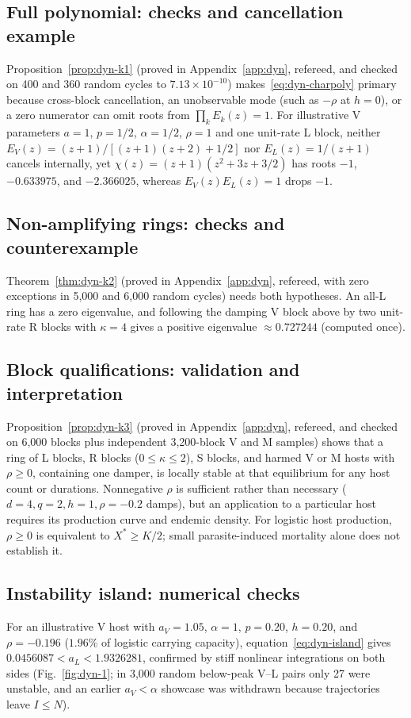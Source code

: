 \subsection{Full polynomial: checks and cancellation example}\label{esm:trim-dyn-k1}
Proposition~\ref{prop:dyn-k1} (proved in Appendix~\ref{app:dyn}, refereed, and checked on 400 and 360 random cycles to $7.13 \times 10^{-10}$) makes~\eqref{eq:dyn-charpoly} primary because cross-block cancellation, an unobservable mode (such as $-\rho$ at $h = 0$), or a zero numerator can omit roots from $\prod_k E_k(z) = 1$. For illustrative V parameters $a = 1$, $p = 1/2$, $\alpha = 1/2$, $\rho = 1$ and one unit-rate L block, neither $E_V(z) = (z + 1)/[(z + 1)(z + 2) + 1/2]$ nor $E_L(z) = 1/(z + 1)$ cancels internally, yet $\chi(z) = (z + 1)(z^2 + 3z + 3/2)$ has roots $-1$, $-0.633975$, and $-2.366025$, whereas $E_V(z)E_L(z) = 1$ drops $-1$.

\subsection{Non-amplifying rings: checks and counterexample}\label{esm:trim-dyn-k2}
Theorem~\ref{thm:dyn-k2} (proved in Appendix~\ref{app:dyn}, refereed, with zero exceptions in 5,000 and 6,000 random cycles) needs both hypotheses. An all-L ring has a zero eigenvalue, and following the damping V block above by two unit-rate R blocks with $\kappa = 4$ gives a positive eigenvalue $\approx 0.727244$ (computed once).

\subsection{Block qualifications: validation and interpretation}\label{esm:trim-dyn-k3}
Proposition~\ref{prop:dyn-k3} (proved in Appendix~\ref{app:dyn}, refereed, and checked on 6,000 blocks plus independent 3,200-block V and M samples) shows that a ring of L blocks, R blocks ($0 \le \kappa \le 2$), S blocks, and harmed V or M hosts with $\rho \ge 0$, containing one damper, is locally stable at that equilibrium for any host count or durations. Nonnegative $\rho$ is sufficient rather than necessary ($d = 4, q = 2, h = 1, \rho = -0.2$ damps), but an application to a particular host requires its production curve and endemic density. For logistic host production, $\rho\geq0$ is equivalent to $X^*\geq K/2$; small parasite-induced mortality alone does not establish it.

\subsection{Instability island: numerical checks}\label{esm:trim-dyn-k4}
For an illustrative V host with $a_V = 1.05$, $\alpha = 1$, $p = 0.20$, $h = 0.20$, and $\rho = -0.196$ ($1.96\%$ of logistic carrying capacity), equation~\eqref{eq:dyn-island} gives $0.0456087 < a_L < 1.9326281$, confirmed by stiff nonlinear integrations on both sides (Fig.~\ref{fig:dyn-1}; in 3,000 random below-peak V--L pairs only 27 were unstable, and an earlier $a_V < \alpha$ showcase was withdrawn because trajectories leave $I \le N$).

